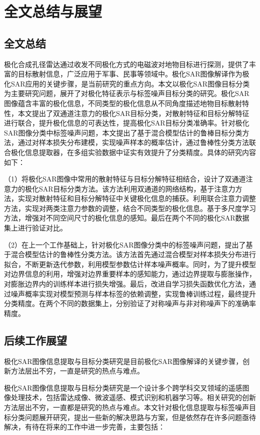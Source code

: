 \chapter{全文总结与展望}
\section{全文总结}
极化合成孔径雷达通过收发不同极化方式的电磁波对地物目标进行探测，提供了丰富的目标散射信息，广泛应用于军事、民事等领域中。极化SAR图像解译作为极化SAR应用的关键步骤，是当前研究的重点方向。本文以极化SAR图像目标分类为主要研究问题，展开了对极化特征表示与标签噪声目标分类的研究。极化SAR图像蕴含丰富的极化信息，不同类型的极化信息从不同角度描述地物目标散射特性，本文提出了双通道注意力的极化SAR目标分类，对散射特征和目标分解特征进行联合，提升极化信息的可表达性，提高极化SAR目标分类准确率。针对极化SAR图像分类中标签噪声问题，本文提出了基于混合模型估计的鲁棒目标分类方法，通过对样本损失分布建模，实现噪声样本的概率估计，通过鲁棒性分类方法联合极化信息提取器，在多组实验数据中证实有效提升了分类精度。具体的研究内容如下：

（1）将极化SAR图像中常用的散射特征与目标分解特征相结合，设计了双通道注意力的极化SAR目标分类方法。该方法利用双通道的网络结构，基于注意力方法，实现对散射特征和目标分解特征中关键极化信息的捕获。利用联合注意力调整方法，实现对两类注意力参数的调整，结合不同类型的极化信息。基于多尺度学习方法，增强对不同空间尺寸的极化信息的感知。最后在两个不同的极化SAR数据集上进行验证对比。

（2）在上一个工作基础上，针对极化SAR图像分类中的标签噪声问题，提出了基于混合模型估计的鲁棒性分类方法。该方法首先通过混合模型对样本损失分布进行拟合，不断更新迭代参数，利用模型参数估计样本噪声概率。同时，为了提升模型对边界信息的利用，增强对边界重要样本的感知能力，通过边界提取与膨胀操作，对膨胀边界内的训练样本进行损失增强。最后，改进自学习损失函数优化方法，通过噪声概率实现对模型预测与样本标签的依赖调整，实现鲁棒训练过程，最终提升分类精度。在两个不同的数据集上，分别验证了对称噪声与非对称噪声下的准确率精度。

\section{后续工作展望}
极化SAR图像信息提取与目标分类研究是目前极化SAR图像解译的关键步骤，创新方法层出不穷，一直是研究的热点与难点。

极化SAR图像信息提取与目标分类研究是一个设计多个跨学科交叉领域的遥感图像处理技术，包括雷达成像、微波遥感、模式识别和机器学习等。相关研究的创新方法层出不穷，一直都是研究的热点与难点。本文针对极化信息提取与标签噪声目标分类问题展开研究，提出一些新的解决思路与方案，但是依然存在许多问题亟待解决，有待在将来的工作中进一步完善，主要包括：

